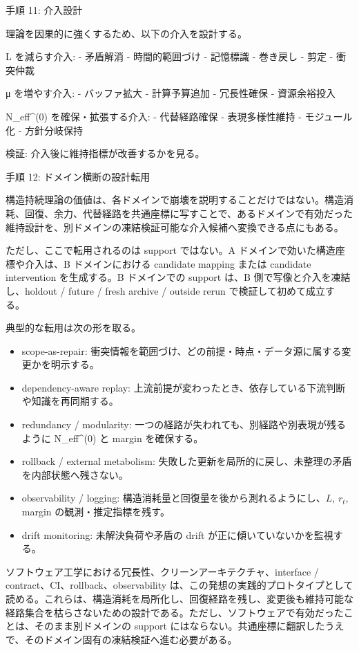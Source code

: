 \documentclass[12pt,a4paper]{article}
\begin{document}
手順 11: 介入設計

理論を因果的に強くするため、以下の介入を設計する。

L を減らす介入: - 矛盾解消 - 時間的範囲づけ - 記憶標識 - 巻き戻し - 剪定 - 衝突仲裁

μ を増やす介入: - バッファ拡大 - 計算予算追加 - 冗長性確保 - 資源余裕投入

N\_eff\^{}(0) を確保・拡張する介入: - 代替経路確保 - 表現多様性維持 - モジュール化 - 方針分岐保持

検証: 介入後に維持指標が改善するかを見る。

手順 12: ドメイン横断の設計転用

構造持続理論の価値は、各ドメインで崩壊を説明することだけではない。構造消耗、回復、余力、代替経路を共通座標に写すことで、あるドメインで有効だった維持設計を、別ドメインの凍結検証可能な介入候補へ変換できる点にもある。

ただし、ここで転用されるのは support ではない。A ドメインで効いた構造座標や介入は、B ドメインにおける candidate mapping または candidate intervention を生成する。B ドメインでの support は、B 側で写像と介入を凍結し、holdout / future / fresh archive / outside rerun で検証して初めて成立する。

典型的な転用は次の形を取る。

\begin{itemize}
\tightlist
\item
  scope-as-repair: 衝突情報を範囲づけ、どの前提・時点・データ源に属する変更かを明示する。
\item
  dependency-aware replay: 上流前提が変わったとき、依存している下流判断や知識を再同期する。
\item
  redundancy / modularity: 一つの経路が失われても、別経路や別表現が残るように N\_eff\^{}(0) と margin を確保する。
\item
  rollback / external metabolism: 失敗した更新を局所的に戻し、未整理の矛盾を内部状態へ残さない。
\item
  observability / logging: 構造消耗量と回復量を後から測れるようにし、\(L\), \(r_{t}\), margin の観測・推定指標を残す。
\item
  drift monitoring: 未解決負荷や矛盾の drift が正に傾いていないかを監視する。
\end{itemize}

ソフトウェア工学における冗長性、クリーンアーキテクチャ、interface / contract、CI、rollback、observability は、この発想の実践的プロトタイプとして読める。これらは、構造消耗を局所化し、回復経路を残し、変更後も維持可能な経路集合を枯らさないための設計である。ただし、ソフトウェアで有効だったことは、そのまま別ドメインの support にはならない。共通座標に翻訳したうえで、そのドメイン固有の凍結検証へ進む必要がある。
\end{document}
